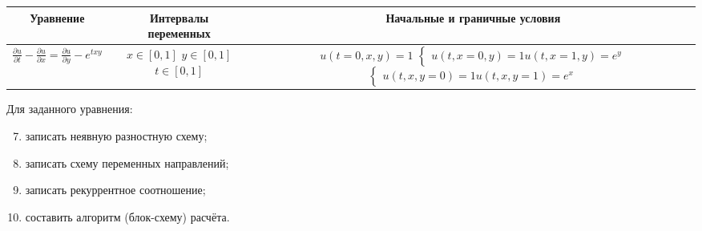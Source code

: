 \documentclass[12pt, a4paper]{report}
\begin{document}
	\begin{center}
		\begin{tabular}{||c|c|c||}
			\hline
			Уравнение & \makecell{Интервалы \\ переменных} & Начальные и граничные условия \\

			\hline
			$ \frac{\partial u}{\partial t} - \frac{\partial u}{\partial x} = \frac{\partial u}{\partial y} - e^{txy} $ & \makecell{$ x \in [0, 1] $ \\ $ y \in [0, 1] $ \\ $ t \in [0, 1] $} & \makecell{$ u(t = 0, x, y) = 1 $ \\ $ \begin{cases} u(t, x = 0, y) = 1 \\ u(t, x = 1, y) = e^{y} \end{cases}$ \\ $ \begin{cases} u(t, x, y = 0) = 1 \\ u(t, x, y = 1) = e^{x} \end{cases} $} \\

			\hline
		\end{tabular}
	\end{center}
	\par
	Для заданного уравнения:
	\begin{enumerate}
		\setcounter{enumi}{6}
		\item записать неявную разностную схему;
		\item записать схему переменных направлений;
		\item записать рекуррентное соотношение;
		\item составить алгоритм (блок-схему) расчёта.
	\end{enumerate}
	
\end{document}
